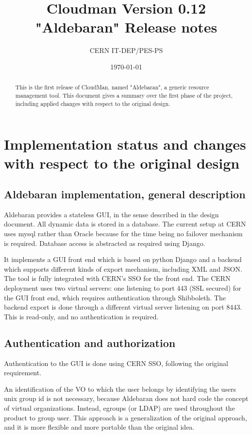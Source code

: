 \documentclass[12pt]{article}
\begin{document}
\thispagestyle{empty}
\title{Cloudman Version 0.12 "Aldebaran" Release notes}
\author{CERN IT-DEP/PES-PS}
\date{\today}
\maketitle 

\begin{abstract}
This is the first release of CloudMan, named "Aldebaran", a generic resource management tool. This document gives a summary over the first phase of the project, including applied changes with respect to the original design. 
\end{abstract}
%
%
\tableofcontents

\section{Implementation status and changes with respect to the original design}

\subsection{Aldebaran implementation, general description}
Aldebaran provides a stateless GUI, in the sense described in the design 
document. All dynamic data is stored in a database. The current setup at CERN 
uses mysql rather than Oracle because for the time being no failover mechanism 
is required. Database access is abstracted as required using Django. 

It implements a GUI front end which is based on python Django and a backend which 
supports different kinds of export mechanism, including XML and JSON. 
The tool is fully integrated with CERN's SSO for the front end. 
The CERN deployment uses two virtual servers: one listening to port 443 (SSL secured) for the GUI front end, which requires authentication through Shibboleth. The
backend export is done through a different virtual server listening on port 8443. 
This is read-only, and no authentication is required.

\subsection{Authentication and authorization}
 Authentication to the GUI is done using CERN SSO, following the original 
requirement. 

An identification of the VO to which the user belongs by identifying the users 
unix group id is not necessary, because Aldebaran does not hard code the concept
of virtual organizations. Instead, egroups (or LDAP) are used throughout the 
product to group user. This approach is a generalization of the original approach,
and it is more flexible and more portable than the original idea. 
\end{document}

